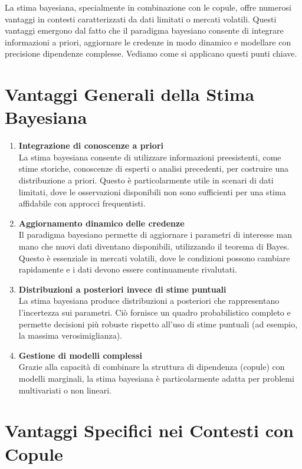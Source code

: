 \documentclass[a4paper,12pt]{article}
\begin{document}
\begin{itemize}
	La stima bayesiana, specialmente in combinazione con le copule, offre numerosi vantaggi in contesti caratterizzati da dati limitati o mercati volatili. Questi vantaggi emergono dal fatto che il paradigma bayesiano consente di integrare informazioni a priori, aggiornare le credenze in modo dinamico e modellare con precisione dipendenze complesse. Vediamo come si applicano questi punti chiave.
	\section*{Vantaggi Generali della Stima Bayesiana}
	
	\begin{enumerate}
		\item \textbf{Integrazione di conoscenze a priori} \\
		La stima bayesiana consente di utilizzare informazioni preesistenti, come stime storiche, conoscenze di esperti o analisi precedenti, per costruire una distribuzione a priori. Questo è particolarmente utile in scenari di dati limitati, dove le osservazioni disponibili non sono sufficienti per una stima affidabile con approcci frequentisti.
		
		\item \textbf{Aggiornamento dinamico delle credenze} \\
		Il paradigma bayesiano permette di aggiornare i parametri di interesse man mano che nuovi dati diventano disponibili, utilizzando il teorema di Bayes. Questo è essenziale in mercati volatili, dove le condizioni possono cambiare rapidamente e i dati devono essere continuamente rivalutati.
		
		\item \textbf{Distribuzioni a posteriori invece di stime puntuali} \\
		La stima bayesiana produce distribuzioni a posteriori che rappresentano l'incertezza sui parametri. Ciò fornisce un quadro probabilistico completo e permette decisioni più robuste rispetto all'uso di stime puntuali (ad esempio, la massima verosimiglianza).
		
		\item \textbf{Gestione di modelli complessi} \\
		Grazie alla capacità di combinare la struttura di dipendenza (copule) con modelli marginali, la stima bayesiana è particolarmente adatta per problemi multivariati o non lineari.
	\end{enumerate}
	\section*{Vantaggi Specifici nei Contesti con Copule}
	

\end{itemize}
\end{document}
